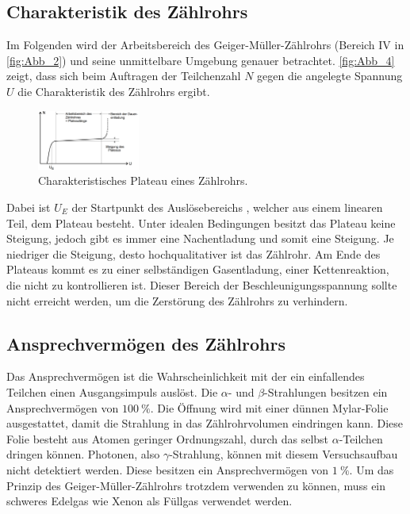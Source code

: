 \subsection{Charakteristik des Zählrohrs}
\label{subsec:Charakteristik}
Im Folgenden wird der Arbeitsbereich des Geiger-Müller-Zählrohrs (Bereich IV in \autoref{fig:Abb_2}) und seine unmittelbare Umgebung genauer betrachtet.
\autoref{fig:Abb_4} zeigt, dass sich beim Auftragen der Teilchenzahl $N$ gegen die angelegte Spannung $U$  die Charakteristik des Zählrohrs ergibt.
\begin{figure}[H]
    \centering
    \includegraphics[width=0.3\textwidth]{Abbildungen/Abb_4.png}
    \caption{Charakteristisches Plateau eines Zählrohrs.\cite{V703}}
    \label{fig:Abb_4}
\end{figure}
Dabei ist $U_E$ der Startpunkt des Auslösebereichs , welcher aus einem linearen Teil, dem Plateau besteht.
Unter idealen Bedingungen besitzt das Plateau keine Steigung, jedoch gibt es immer eine Nachentladung und somit eine 
Steigung. Je niedriger die Steigung, desto hochqualitativer ist das Zählrohr.
Am Ende des Plateaus kommt es zu einer selbständigen Gasentladung, einer Kettenreaktion, die nicht zu kontrollieren ist.
Dieser Bereich der Beschleunigungsspannung sollte nicht erreicht werden, um die Zerstörung des Zählrohrs zu verhindern.

\subsection{Ansprechvermögen des Zählrohrs}
\label{subsec:Ansprechvermögen}
Das Ansprechvermögen ist die Wahrscheinlichkeit mit der ein einfallendes Teilchen einen Ausgangsimpuls auslöst.
Die $\alpha$- und $\beta$-Strahlungen besitzen ein Ansprechvermögen von $\qty{100}{\percent}$. Die Öffnung wird mit einer 
dünnen Mylar-Folie ausgestattet, damit die Strahlung in das Zählrohrvolumen eindringen kann. Diese Folie besteht aus Atomen
geringer Ordnungszahl, durch das selbst $\alpha$-Teilchen dringen können. Photonen, also $\gamma$-Strahlung, können
mit diesem Versuchsaufbau nicht detektiert werden. Diese besitzen ein Ansprechvermögen von $\qty{1}{\percent}$. Um das Prinzip des 
Geiger-Müller-Zählrohrs trotzdem verwenden zu können, muss ein schweres Edelgas wie Xenon als Füllgas verwendet werden.
